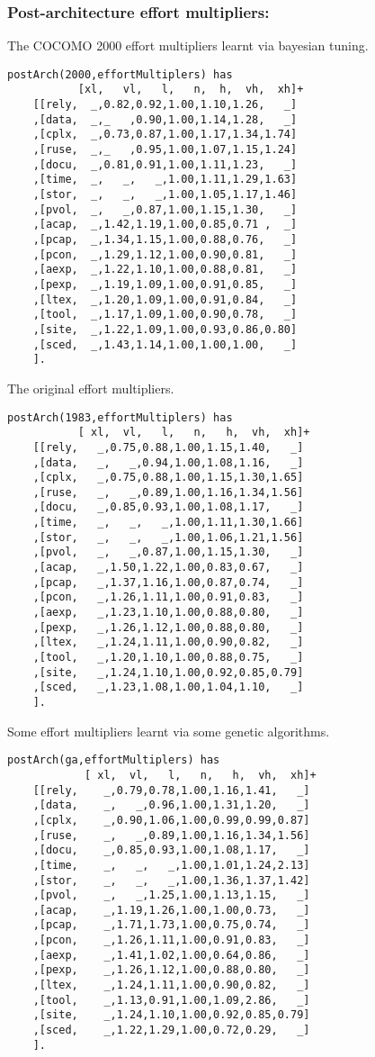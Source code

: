 \subsubsection{ Post-architecture effort multipliers:
}
 The COCOMO 2000 effort multipliers learnt
via bayesian tuning. 
\begin{Verbatim}
postArch(2000,effortMultiplers) has
           [xl,   vl,   l,   n,  h,  vh,  xh]+
    [[rely,  _,0.82,0.92,1.00,1.10,1.26,   _]
    ,[data,  _,_   ,0.90,1.00,1.14,1.28,   _]
    ,[cplx,  _,0.73,0.87,1.00,1.17,1.34,1.74]
    ,[ruse,  _,_   ,0.95,1.00,1.07,1.15,1.24]
    ,[docu,  _,0.81,0.91,1.00,1.11,1.23,   _]
    ,[time,  _,   _,   _,1.00,1.11,1.29,1.63]
    ,[stor,  _,   _,   _,1.00,1.05,1.17,1.46]
    ,[pvol,  _,   _,0.87,1.00,1.15,1.30,   _]
    ,[acap,  _,1.42,1.19,1.00,0.85,0.71 ,  _]
    ,[pcap,  _,1.34,1.15,1.00,0.88,0.76,   _]
    ,[pcon,  _,1.29,1.12,1.00,0.90,0.81,   _]
    ,[aexp,  _,1.22,1.10,1.00,0.88,0.81,   _]
    ,[pexp,  _,1.19,1.09,1.00,0.91,0.85,   _]
    ,[ltex,  _,1.20,1.09,1.00,0.91,0.84,   _]
    ,[tool,  _,1.17,1.09,1.00,0.90,0.78,   _]
    ,[site,  _,1.22,1.09,1.00,0.93,0.86,0.80]
    ,[sced,  _,1.43,1.14,1.00,1.00,1.00,   _]
    ].
\end{Verbatim}
 The original effort multipliers. 
\begin{Verbatim}
postArch(1983,effortMultiplers) has
           [ xl,  vl,   l,   n,   h,  vh,  xh]+
    [[rely,   _,0.75,0.88,1.00,1.15,1.40,   _]
    ,[data,   _,   _,0.94,1.00,1.08,1.16,   _]
    ,[cplx,   _,0.75,0.88,1.00,1.15,1.30,1.65]
    ,[ruse,   _,   _,0.89,1.00,1.16,1.34,1.56]
    ,[docu,   _,0.85,0.93,1.00,1.08,1.17,   _]
    ,[time,   _,   _,   _,1.00,1.11,1.30,1.66]
    ,[stor,   _,   _,   _,1.00,1.06,1.21,1.56]
    ,[pvol,   _,   _,0.87,1.00,1.15,1.30,   _]
    ,[acap,   _,1.50,1.22,1.00,0.83,0.67,   _]
    ,[pcap,   _,1.37,1.16,1.00,0.87,0.74,   _]
    ,[pcon,   _,1.26,1.11,1.00,0.91,0.83,   _]
    ,[aexp,   _,1.23,1.10,1.00,0.88,0.80,   _]
    ,[pexp,   _,1.26,1.12,1.00,0.88,0.80,   _]
    ,[ltex,   _,1.24,1.11,1.00,0.90,0.82,   _]
    ,[tool,   _,1.20,1.10,1.00,0.88,0.75,   _]
    ,[site,   _,1.24,1.10,1.00,0.92,0.85,0.79]
    ,[sced,   _,1.23,1.08,1.00,1.04,1.10,   _]
    ].
\end{Verbatim}
 Some effort multipliers learnt via some
genetic algorithms. 
\begin{Verbatim}
postArch(ga,effortMultiplers) has
            [ xl,  vl,   l,   n,   h,  vh,  xh]+
    [[rely,    _,0.79,0.78,1.00,1.16,1.41,   _]
    ,[data,    _,   _,0.96,1.00,1.31,1.20,   _]
    ,[cplx,    _,0.90,1.06,1.00,0.99,0.99,0.87]
    ,[ruse,    _,   _,0.89,1.00,1.16,1.34,1.56]
    ,[docu,    _,0.85,0.93,1.00,1.08,1.17,   _]
    ,[time,    _,   _,   _,1.00,1.01,1.24,2.13]
    ,[stor,    _,   _,   _,1.00,1.36,1.37,1.42]
    ,[pvol,    _,   _,1.25,1.00,1.13,1.15,   _]
    ,[acap,    _,1.19,1.26,1.00,1.00,0.73,   _]
    ,[pcap,    _,1.71,1.73,1.00,0.75,0.74,   _]
    ,[pcon,    _,1.26,1.11,1.00,0.91,0.83,   _]
    ,[aexp,    _,1.41,1.02,1.00,0.64,0.86,   _]
    ,[pexp,    _,1.26,1.12,1.00,0.88,0.80,   _]
    ,[ltex,    _,1.24,1.11,1.00,0.90,0.82,   _]
    ,[tool,    _,1.13,0.91,1.00,1.09,2.86,   _]
    ,[site,    _,1.24,1.10,1.00,0.92,0.85,0.79]
    ,[sced,    _,1.22,1.29,1.00,0.72,0.29,   _]
    ].
\end{Verbatim}
